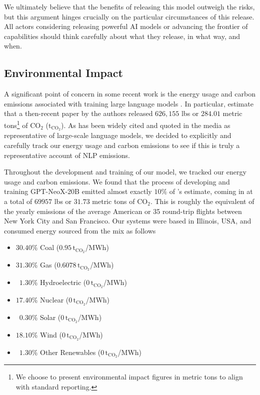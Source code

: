 \documentclass[11pt]{article}
\newcommand{\model}{GPT-NeoX-20B}
\begin{document}
We ultimately believe that the benefits of releasing this model outweigh the risks, but this argument hinges crucially on the particular circumstances of this release. All actors considering releasing powerful AI models or advancing the frontier of capabilities should think carefully about what they release, in what way, and when. 

\subsection{Environmental Impact}
\label{subsec:environmental-impact}

A significant point of concern in some recent work is the energy usage and carbon emissions associated with training large language models \citep{strubell2019energy,schwartz2020green,lacoste2019quantifying,bender2021dangers}. In particular, \citet{strubell2019energy} estimate that a then-recent paper by the authors released $626,155$ lbs or $284.01$ metric tons\footnote{We choose to present environmental impact figures in metric tons to align with standard reporting.} of $\mathrm{CO_2}$ ($\mathrm{t_{CO_2}}$). As \citet{strubell2019energy} has been widely cited and quoted in the media as representative of large-scale language models, we decided to explicitly and carefully track our energy usage and carbon emissions to see if this is truly a representative account of NLP emissions.

Throughout the development and training of our model, we tracked our energy usage and carbon emissions. We found that the process of developing and training \model{} emitted almost exactly $10\%$ of \citet{strubell2019energy}'s estimate, coming in at a total of $69957$ lbs or $31.73$ metric tons of $\mathrm{CO_2}$. This is roughly the equivalent of the yearly emissions of the average American or 35 round-trip flights between New York City and San Francisco. Our systems were based in Illinois, USA, and consumed energy sourced from the mix as follows

\begin{itemize}
    \item $30.40\%$ Coal ($0.95\,\mathrm{ t_{CO_2}}$/MWh)
    \item $31.30\%$ Gas ($0.6078\,\mathrm{ t_{CO_2}}$/MWh)
    \item $\phantom{0}1.30\%$ Hydroelectric ($0\,\mathrm{ t_{CO_2}}$/MWh)
    \item $17.40\%$ Nuclear ($0\,\mathrm{ t_{CO_2}}$/MWh)
    \item $\phantom{0}0.30\%$ Solar ($0\,\mathrm{ t_{CO_2}}$/MWh)
    \item $18.10\%$ Wind ($0\,\mathrm{ t_{CO_2}}$/MWh)
    \item $\phantom{0}1.30\%$ Other Renewables ($0\,\mathrm{t_{CO_2}}$/MWh)
\end{itemize}
\end{document}
